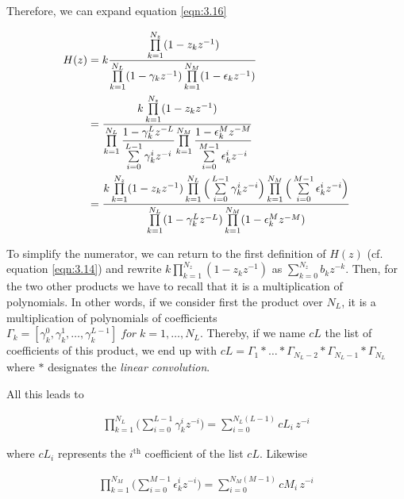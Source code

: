 Therefore, we can expand equation \ref{eqn:3.16}

\begin{equation}
	\begin{aligned}
H(z) &= k\cfrac{\prod\limits_{k=1}^{N_z} (1 - z_k z^{-1} )}{\prod\limits_{k=1}^{N_L} (1 - \gamma_k z^{-1})\prod\limits_{k=1}^{N_M} (1 - \epsilon_k z^{-1})} \\ 
&= \cfrac{k\prod\limits_{k=1}^{N_z} (1 - z_k z^{-1} )}{\prod\limits_{k=1}^{N_L} \cfrac{1 - \gamma_k^L z^{-L}}{\sum\limits_{i=0}^{L-1}\gamma_k^i z^{-i}} \prod\limits_{k=1}^{N_M} \cfrac{1 - \epsilon_k^M z^{-M}}{\sum\limits_{i=0}^{M-1}\epsilon_k^i z^{-i}}} \\
& = \cfrac{k\prod\limits_{k=1}^{N_z} (1 - z_k z^{-1} ) \prod\limits_{k=1}^{N_L}\Big (\sum\limits_{i=0}^{L-1}\gamma_k^i z^{-i} \Big )\prod\limits_{k=1}^{N_M} \Big (\sum\limits_{i=0}^{M-1}\epsilon_k^i z^{-i} \Big )}{\prod\limits_{k=1}^{N_L} (1 - \gamma_k^L z^{-L}) \prod\limits_{k=1}^{N_M} (1 - \epsilon_k^M z^{-M}) }
\label{eqn:3.18}
	\end{aligned}
\end{equation}

To simplify the numerator, we can return to the first definition of $H(z)$ (cf. equation \ref{eqn:3.14}) and rewrite $k\prod\limits_{k=1}^{N_z} (1 - z_k z^{-1})$ as $\sum\limits_{k=0}^{N_z} b_kz^{-k}$.
Then, for the two other products we have to recall that it is a multiplication of polynomials. In other words, if we consider first the product over $N_L$, it is a multiplication of polynomials of coefficients $\Gamma_k = [\gamma_k^0, \gamma_k^1, \dots, \gamma_k^{L-1}] \;for\; k = 1, \dots, N_L$. Thereby, if we name $cL$ the list of coefficients of this product, we end up with $cL = \Gamma_1*\dots*\Gamma_{N_L-2}*\Gamma_{N_L-1}*\Gamma_{N_L}$where $*$ designates the \textit{linear convolution}. 

All this leads to 

\begin{align}
	\prod\limits_{k=1}^{N_L}\Big (\sum\limits_{i=0}^{L-1}\gamma_k^i z^{-i} \Big ) = \sum\limits_{i=0}^{N_L(L-1)}cL_i\,z^{-i}
	\label{eqn:3.19}
\end{align}

where $cL_i$ represents the $i^{\text{th}}$ coefficient of the list $cL$. Likewise

\begin{align}
\prod\limits_{k=1}^{N_M}\Big (\sum\limits_{i=0}^{M-1}\epsilon_k^i z^{-i} \Big ) = \sum\limits_{i=0}^{N_M(M-1)}cM_i\,z^{-i}
\label{eqn:3.20}
\end{align}

